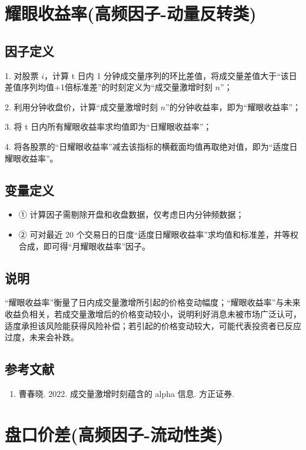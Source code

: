 \documentclass{article}
\begin{document}
\section{耀眼收益率(高频因子-动量反转类)}

\subsection{因子定义}

1. 对股票 \( i \)，计算 t 日内 1 分钟成交量序列的环比差值，将成交量差值大于“该日差值序列均值+1倍标准差”的时刻定义为“成交量激增时刻 \( n \)”；

2. 利用分钟收盘价，计算“成交量激增时刻 \( n \)”的分钟收益率，即为“耀眼收益率”；

3. 将 t 日内所有耀眼收益率求均值即为“日耀眼收益率”；

4. 将各股票的“日耀眼收益率”减去该指标的横截面均值再取绝对值，即为“适度日耀眼收益率”。

\subsection{变量定义}
\begin{itemize}
    \item ① 计算因子需剔除开盘和收盘数据，仅考虑日内分钟频数据；
    \item ② 可对最近 20 个交易日的日度“适度日耀眼收益率”求均值和标准差，并等权合成，即可得“月耀眼收益率”因子。
\end{itemize}

\subsection{说明}
“耀眼收益率”衡量了日内成交量激增所引起的价格变动幅度；“耀眼收益率”与未来收益负相关，若成交量激增后的价格变动较小，说明利好消息未被市场广泛认可，适度承担该风险能获得风险补偿；若引起的价格变动较大，可能代表投资者已反应过度，未来会补跌。

\subsection{参考文献}
\begin{enumerate}
    \item 曹春晓. 2022. 成交量激增时刻蕴含的 alpha 信息. 方正证券.
\end{enumerate}

\section{盘口价差(高频因子-流动性类)}
\end{document}
